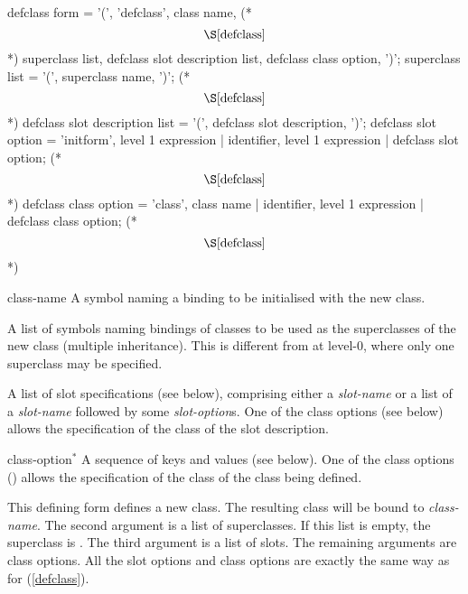 %
\begin{optDefinition}
\label{defclass-1}
%
\Syntax
\label{defclass-syntax}
\savesyntax{}\vbox{\small\syntax
defclass form
   = '(', 'defclass',
     class name, (* \[\S\ref{defclass}\] *)
     superclass list,
     defclass slot description list,
     {defclass class option}, ')';
superclass list
   = '(', {superclass name}, ')'; (* \[\S\ref{defclass}\] *)
defclass slot description list
   = '(', {defclass slot description}, ')';
defclass slot option
   = 'initform', level 1 expression
   | identifier, level 1 expression
   | defclass slot option; (* \[\S\ref{defclass}\] *)
defclass class option
   = 'class', class name
   | identifier, level 1 expression
   | defclass class option; (* \[\S\ref{defclass}\] *)
\endsyntax}

\begin{arguments}
    \item[class-name] A symbol naming a binding to be initialised with the new
    class.

    \item[\group{superclass\/$^*$}] A list of symbols naming bindings of classes
    to be used as the superclasses of the new class (multiple
    inheritance).  This is different from  at level-0,
    where only one superclass may be specified.

    \item[\group{slot\/$^*$}] A list of slot specifications (see
    below), comprising either a {\em slot-name} or a list of a {\em slot-name}
    followed by some {\em slot-option}s.  One of the class options (see below)
    allows the specification of the class of the slot description.

    \item[class-option\/$^*$] A sequence of keys and values (see below).  One of
    the class options () allows the specification of the class
    of the class being defined.
\end{arguments}
%
\remarks%
This defining form defines a new class.  The resulting class will be
bound to {\em class-name}.  The second argument is a list of
superclasses.  If this list is empty, the superclass is .
The third argument is a list of slots.  The remaining
arguments are class options.  All the slot options and class options
are exactly the same way as for  (\ref{defclass}).


\end{optDefinition}
